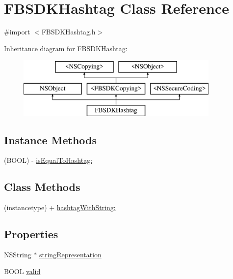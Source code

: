 \hypertarget{interface_f_b_s_d_k_hashtag}{}\section{F\+B\+S\+D\+K\+Hashtag Class Reference}
\label{interface_f_b_s_d_k_hashtag}


{\ttfamily \#import $<$F\+B\+S\+D\+K\+Hashtag.\+h$>$}

Inheritance diagram for F\+B\+S\+D\+K\+Hashtag\+:\begin{figure}[H]
\begin{center}
\leavevmode
\includegraphics[height=3.000000cm]{interface_f_b_s_d_k_hashtag}
\end{center}
\end{figure}
\subsection*{Instance Methods}
\begin{DoxyCompactItemize}
\item 
(B\+O\+O\+L) -\/ \hyperlink{interface_f_b_s_d_k_hashtag_a5b14718276182cf94139268e5711f1d5}{is\+Equal\+To\+Hashtag\+:}
\end{DoxyCompactItemize}
\subsection*{Class Methods}
\begin{DoxyCompactItemize}
\item 
(instancetype) + \hyperlink{interface_f_b_s_d_k_hashtag_a60ed67ee0944520281900c985f139e30}{hashtag\+With\+String\+:}
\end{DoxyCompactItemize}
\subsection*{Properties}
\begin{DoxyCompactItemize}
\item 
N\+S\+String $\ast$ \hyperlink{interface_f_b_s_d_k_hashtag_aea104147de1efdc3eb12928736b615f4}{string\+Representation}
\item 
B\+O\+O\+L \hyperlink{interface_f_b_s_d_k_hashtag_a861ca020354206959069ee7fad096259}{valid}
\end{DoxyCompactItemize}


